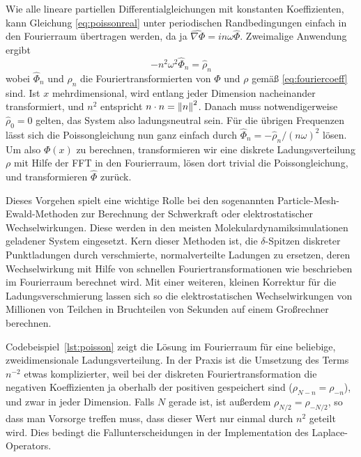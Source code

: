 Wie alle lineare partiellen Differentialgleichungen mit konstanten
Koeffizienten, kann Gleichung \eqref{eq:poissonreal} unter
periodischen Randbedingungen einfach in den Fourierraum übertragen
werden, da ja $\widehat{\nabla \Phi} = i n \omega \hat \Phi$. Zweimalige
Anwendung ergibt
\begin{equation}
  \label{eq:poissonft}
  -n^2\omega^2\hat\Phi_n  = \hat\rho_n
\end{equation}
wobei $\hat\Phi_n$ und $\hat\rho_n$ die Fouriertransformierten von
$\Phi$ und $\rho$ gemäß \eqref{eq:fouriercoeff} sind. Ist $x$
mehrdimensional, wird entlang jeder Dimension nacheinander
transformiert, und $n^2$ entspricht $n\cdot n = \left\lVert{n}\right\rVert^2$. Danach muss
notwendigerweise $\hat\rho_0 = 0$ gelten, das System also
ladungsneutral sein. Für die übrigen Frequenzen lässt sich die
Poissongleichung nun ganz einfach durch $\hat\Phi_n =
-\hat\rho_n/(n\omega)^2$ lösen. Um also $\Phi(x)$ zu berechnen,
transformieren wir eine diskrete Ladungsverteilung $\rho$ mit Hilfe
der FFT in den Fourierraum, lösen dort trivial die Poissongleichung,
und transformieren $\hat\Phi$ zurück.

%

Dieses Vorgehen spielt eine wichtige Rolle bei den sogenannten
Particle-Mesh-Ewald-Methoden zur Berechnung der Schwerkraft oder
elektrostatischer Wechselwirkungen. Diese werden in den meisten
Molekulardynamiksimulationen geladener System eingesetzt. Kern dieser
Methoden ist, die $\delta$-Spitzen diskreter Punktladungen durch
verschmierte, normalverteilte Ladungen zu ersetzen, deren
Wechselwirkung mit Hilfe von schnellen Fouriertransformationen wie
beschrieben im Fourierraum berechnet wird. Mit einer weiteren, kleinen
Korrektur für die Ladungsverschmierung lassen sich so die
elektrostatischen Wechselwirkungen von Millionen von Teilchen in
Bruchteilen von Sekunden auf einem Großrechner berechnen.

Codebeispiel~\ref{lst:poisson} zeigt die Lösung im Fourierraum für
eine beliebige, zweidimensionale Ladungsverteilung. In der Praxis ist
die Umsetzung des Terms $n^{-2}$ etwas komplizierter, weil bei der
diskreten Fouriertransformation die negativen Koeffizienten ja
oberhalb der positiven gespeichert sind ($\rho_{N-n}=\rho_{-n}$), und
zwar in jeder Dimension. Falls $N$ gerade ist, ist außerdem
$\rho_{N/2} = \rho_{-N/2}$, so dass man Vorsorge treffen muss, dass
dieser Wert nur einmal durch $n^2$ geteilt wird. Dies bedingt die
Fallunterscheidungen in der Implementation des Laplace-Operators.

